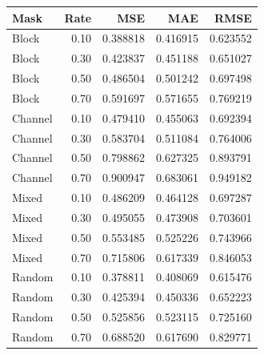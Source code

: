 \begin{tabular}{@{}lrrrr@{}}
\toprule
Mask & Rate & MSE & MAE & RMSE \\
\midrule
Block & 0.10 & 0.388818 & 0.416915 & 0.623552 \\
Block & 0.30 & 0.423837 & 0.451188 & 0.651027 \\
Block & 0.50 & 0.486504 & 0.501242 & 0.697498 \\
Block & 0.70 & 0.591697 & 0.571655 & 0.769219 \\
Channel & 0.10 & 0.479410 & 0.455063 & 0.692394 \\
Channel & 0.30 & 0.583704 & 0.511084 & 0.764006 \\
Channel & 0.50 & 0.798862 & 0.627325 & 0.893791 \\
Channel & 0.70 & 0.900947 & 0.683061 & 0.949182 \\
Mixed & 0.10 & 0.486209 & 0.464128 & 0.697287 \\
Mixed & 0.30 & 0.495055 & 0.473908 & 0.703601 \\
Mixed & 0.50 & 0.553485 & 0.525226 & 0.743966 \\
Mixed & 0.70 & 0.715806 & 0.617339 & 0.846053 \\
Random & 0.10 & 0.378811 & 0.408069 & 0.615476 \\
Random & 0.30 & 0.425394 & 0.450336 & 0.652223 \\
Random & 0.50 & 0.525856 & 0.523115 & 0.725160 \\
Random & 0.70 & 0.688520 & 0.617690 & 0.829771 \\
\bottomrule
\end{tabular}
